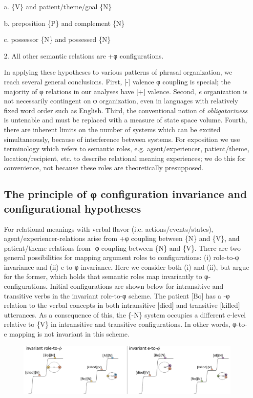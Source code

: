   a. \{V\} and patient/theme/goal \{N\}

  b. preposition \{P\} and complement \{N\}

  c. possessor \{N\} and possessed \{N\}

2. All other semantic relations are +φ configurations.

  In applying these hypotheses to various patterns of phrasal organization, we reach several general conclusions. First, [-] valence φ coupling is special; the majority of φ relations in our analyses have [+] valence. Second, \textit{e} organization is not necessarily contingent on φ organization, even in languages with relatively fixed word order such as English. Third, the conventional notion of \textit{obligatoriness} is untenable and must be replaced with a measure of state space volume. Fourth, there are inherent limits on the number of systems which can be excited simultaneously, because of interference between systems. For exposition we use terminology which refers to semantic roles, e.g. agent/experiencer, patient/theme, location/recipient, etc. to describe relational meaning experiences; we do this for convenience, not because these roles are theoretically presupposed.

\subsection{The principle of \textup{φ configuration} invariance and configurational hypotheses}

For relational meanings with verbal flavor (i.e. actions/events/states), agent/experiencer-relations arise from +φ coupling between \{N\} and \{V\}, and patient/theme-relations from -φ coupling between \{N\} and \{V\}. There are two general possibilities for mapping argument roles to configurations: (i) role-to-φ invariance and (ii) e-to-φ invariance. Here we consider both (i) and (ii), but argue for the former, which holds that semantic roles map invariantly to φ-configurations. Initial configurations are shown below for intransitive and transitive verbs in the invariant role-to-φ scheme. The patient [Bo] has a -φ relation to the verbal concepts in both intransitive [died] and transitive [killed] utterances. As a consequence of this, the \{-N\} system occupies a different e-level relative to \{V\} in intransitive and transitive configurations. In other words, φ-to-e mapping is not invariant in this scheme.

  
\begin{figure}
\includegraphics[width=\textwidth]{figures/Tilsen-img71.png}
\caption{\missingcaption}
\label{fig:}
\end{figure}
 

